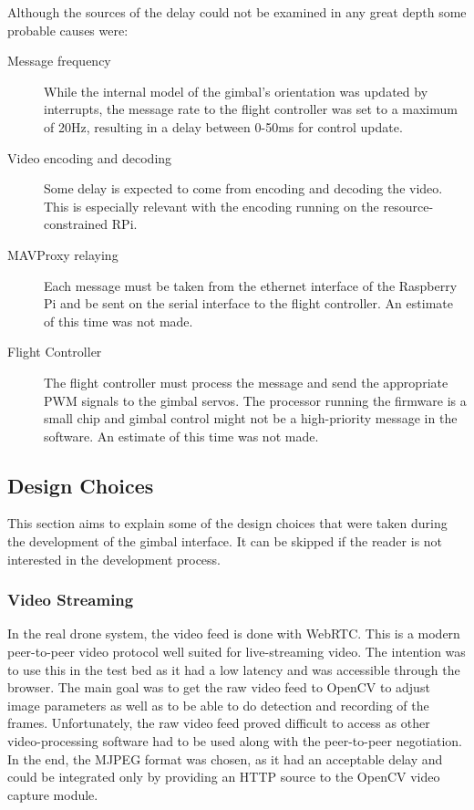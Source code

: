 \documentclass[nofilelist]{cslthse-msc}
\begin{document}
Although the sources of the delay could not be examined in any great depth some probable causes were:
\begin{description}
   \item[Message frequency] 
   While the internal model of the gimbal's orientation was updated by interrupts, the message rate to the flight controller was set to a maximum of 20Hz, resulting in a delay between 0-50ms for control update.
   
   \item [Video encoding and decoding]
   Some delay is expected to come from encoding and decoding the video. This is especially relevant with the encoding running on the resource-constrained RPi.  

   \item[MAVProxy relaying] Each message must be taken from the ethernet interface of the Raspberry Pi and be sent on the serial interface to the flight controller. An estimate of this time was not made.
   
   \item[Flight Controller] The flight controller must process the message and send the appropriate PWM signals to the gimbal servos. The processor running the firmware is a small chip and gimbal control might not be a high-priority message in the software. An estimate of this time was not made.
\end{description}

\subsection{Design Choices} 
This section aims to explain some of the design choices that were taken during the development of the gimbal interface. It can be skipped if the reader is not interested in the development process.

\subsubsection{Video Streaming}
In the real drone system, the video feed is done with WebRTC. This is a modern peer-to-peer video protocol well suited for live-streaming video. The intention was to use this in the test bed as it had a low latency and was accessible through the browser. The main goal was to get the raw video feed to OpenCV to adjust image parameters as well as to be able to do detection and recording of the frames. Unfortunately, the raw video feed proved difficult to access as other video-processing software had to be used along with the peer-to-peer negotiation. In the end, the MJPEG format was chosen, as it had an acceptable delay and could be integrated only by providing an HTTP source to the OpenCV video capture module.
\end{document}
